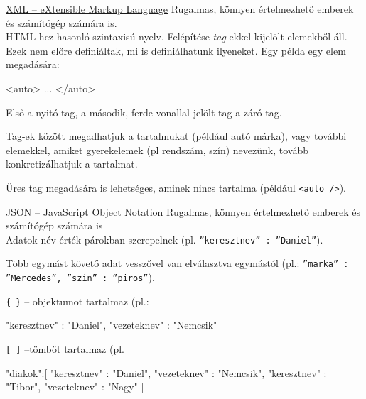 \bigskip

\noindent \underline{XML – eXtensible Markup Language}
\vspace{10pt}
\newline \noindent Rugalmas, könnyen értelmezhető emberek és számítógép számára is.  
\vspace{5pt}\\HTML-hez hasonló szintaxisú nyelv. Felépítése \textit{tag}-ekkel kijelölt elemekből áll. Ezek nem előre definiáltak, mi is definiálhatunk ilyeneket. Egy példa egy elem megadására:
\begin{java}
<auto> ... </auto>
\end{java}
Első a nyitó tag, a második, ferde vonallal jelölt tag a záró tag.

Tag-ek között megadhatjuk a tartalmukat (például autó márka), vagy további elemekkel, amiket gyerekelemek (pl rendszám, szín) nevezünk, tovább konkretizálhatjuk a tartalmat.

Üres tag megadására is lehetséges, aminek nincs tartalma (például \texttt{<auto />}).


\bigskip

\noindent \underline{JSON – JavaScript Object Notation}
\vspace{10pt}
\newline \noindent Rugalmas, könnyen értelmezhető emberek és számítógép számára is
\vspace{5pt}\\ Adatok név-érték párokban szerepelnek (pl. \texttt{”keresztnev” : ”Daniel”}).

Több egymást követő adat vesszővel van elválasztva egymástól (pl.: \texttt{”marka” : ”Mercedes”, ”szin” : ”piros”}).

\texttt{\{ \}} – objektumot tartalmaz (pl.: 
\begin{java}
{"keresztnev" : "Daniel", "vezeteknev" : "Nemcsik"}
\end{java}

\texttt{[ ]} –tömböt tartalmaz (pl. 
\begin{java}
{ "diakok":[
{"keresztnev" : "Daniel", "vezeteknev" : "Nemcsik"},
{"keresztnev" : "Tibor", "vezeteknev" : "Nagy"}
]}
\end{java}

